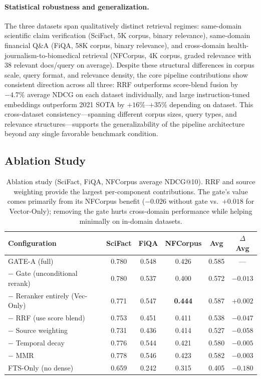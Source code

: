 \documentclass[11pt]{article}
\begin{document}
\paragraph{Statistical robustness and generalization.}
The three datasets span qualitatively distinct retrieval regimes: same-domain scientific
claim verification (SciFact, 5K corpus, binary relevance), same-domain financial Q\&A
(FiQA, 58K corpus, binary relevance), and cross-domain health-journalism-to-biomedical
retrieval (NFCorpus, 4K corpus, graded relevance with 38 relevant docs/query on
average). Despite these structural differences in corpus scale, query format, and
relevance density, the core pipeline contributions show consistent direction across all
three: RRF outperforms score-blend fusion by $-4.7\%$ average NDCG on each dataset
individually, and large instruction-tuned embeddings outperform 2021 SOTA by
$+16\%$--$+35\%$ depending on dataset. This cross-dataset consistency---spanning
different corpus sizes, query types, and relevance structures---supports the
generalizability of the pipeline architecture beyond any single favorable benchmark
condition.

\subsection{Ablation Study}

\begin{table}[H]
\centering
\small
\begin{tabular}{lccccc}
\toprule
\textbf{Configuration} & \textbf{SciFact} & \textbf{FiQA} & \textbf{NFCorpus} & \textbf{Avg} & \textbf{$\Delta$ Avg} \\
\midrule
GATE-A (full) & 0.780 & 0.548 & 0.426 & 0.585 & --- \\
$-$ Gate (unconditional rerank) & 0.780 & 0.537 & 0.400 & 0.572 & $-0.013$ \\
$-$ Reranker entirely (Vec-Only) & 0.771 & 0.547 & \textbf{0.444} & 0.587 & $+0.002$ \\
$-$ RRF (use score blend) & 0.753 & 0.451 & 0.411 & 0.538 & $-0.047$ \\
$-$ Source weighting & 0.731 & 0.436 & 0.414 & 0.527 & $-0.058$ \\
$-$ Temporal decay & 0.776 & 0.544 & 0.421 & 0.580 & $-0.005$ \\
$-$ MMR & 0.778 & 0.546 & 0.423 & 0.582 & $-0.003$ \\
FTS-Only (no dense) & 0.659 & 0.242 & 0.315 & 0.405 & $-0.180$ \\
\bottomrule
\end{tabular}
\caption{Ablation study (SciFact, FiQA, NFCorpus average NDCG@10). RRF and source
weighting provide the largest per-component contributions. The gate's value comes
primarily from its NFCorpus benefit ($-0.026$ without gate vs.\ $+0.018$ for
Vector-Only); removing the gate hurts cross-domain performance while helping minimally
on in-domain datasets.}
\label{tab:ablation}
\end{table}
\end{document}
